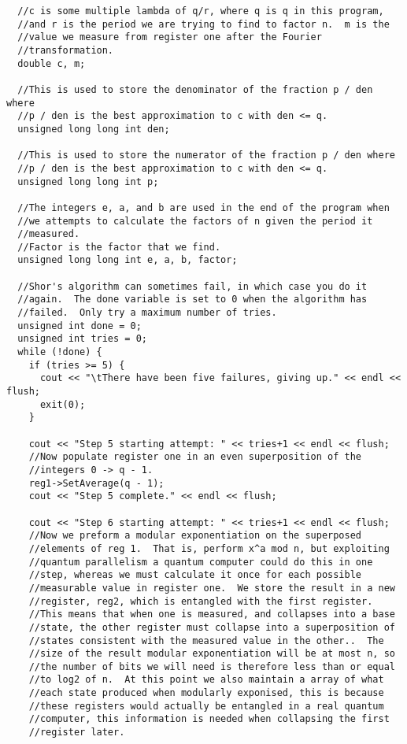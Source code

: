 \documentclass[]{article}
\begin{document}
\begin{verbatim}
  //c is some multiple lambda of q/r, where q is q in this program,
  //and r is the period we are trying to find to factor n.  m is the
  //value we measure from register one after the Fourier
  //transformation.
  double c, m; 
  
  //This is used to store the denominator of the fraction p / den where
  //p / den is the best approximation to c with den <= q.
  unsigned long long int den;
  
  //This is used to store the numerator of the fraction p / den where
  //p / den is the best approximation to c with den <= q.
  unsigned long long int p;
  
  //The integers e, a, and b are used in the end of the program when
  //we attempts to calculate the factors of n given the period it
  //measured.
  //Factor is the factor that we find.
  unsigned long long int e, a, b, factor;

  //Shor's algorithm can sometimes fail, in which case you do it
  //again.  The done variable is set to 0 when the algorithm has
  //failed.  Only try a maximum number of tries.
  unsigned int done = 0;
  unsigned int tries = 0;
  while (!done) {
    if (tries >= 5) {
      cout << "\tThere have been five failures, giving up." << endl << flush;
      exit(0);
    }

    cout << "Step 5 starting attempt: " << tries+1 << endl << flush;
    //Now populate register one in an even superposition of the
    //integers 0 -> q - 1.
    reg1->SetAverage(q - 1);
    cout << "Step 5 complete." << endl << flush;

    cout << "Step 6 starting attempt: " << tries+1 << endl << flush;
    //Now we preform a modular exponentiation on the superposed
    //elements of reg 1.  That is, perform x^a mod n, but exploiting
    //quantum parallelism a quantum computer could do this in one
    //step, whereas we must calculate it once for each possible
    //measurable value in register one.  We store the result in a new
    //register, reg2, which is entangled with the first register.
    //This means that when one is measured, and collapses into a base
    //state, the other register must collapse into a superposition of
    //states consistent with the measured value in the other..  The
    //size of the result modular exponentiation will be at most n, so
    //the number of bits we will need is therefore less than or equal
    //to log2 of n.  At this point we also maintain a array of what
    //each state produced when modularly exponised, this is because
    //these registers would actually be entangled in a real quantum
    //computer, this information is needed when collapsing the first
    //register later.


\end{verbatim}
\end{document}
